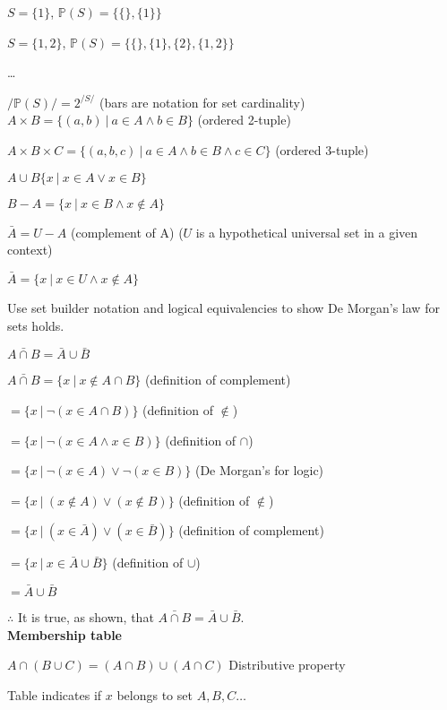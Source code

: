 \documentclass[english,openany]{book}
\begin{document}
	$S = \{1\}$, $\mathbb P (S) = \{  \{\}, \{1\}  \}$

	$S = \{1, 2\}$, $\mathbb P (S) = \{  \{\},  \{ 1 \}, \{ 2 \},  \{1, 2\}  \}$

	\dots

	$/ \mathbb P(S)/ = 2^{ /S/ }$ (bars are notation for set cardinality)\\

	$A \times B = \{ (a,b)\ |\ a \in A \wedge b \in B \}$ (ordered 2-tuple)

	$A \times B \times C = \{ (a,b,c)\ |\ a \in A \wedge b \in B \wedge c \in C \}$ (ordered 3-tuple)

	$A \cup B \{ x \ | \ x \in A \lor x \in B\}$

	$B - A = \{ x \ |\ x \in B \wedge x \notin A \}$

	$\bar{A} = U - A$ (complement of A) ($U$ is a hypothetical universal set in a given context)

	$\bar{A} = \{ x \ |\ x \in U \wedge x \notin A \}$

		Use set builder notation and logical equivalencies to show De Morgan's law for sets holds.

	$\bar{A \cap B} = \bar{A} \cup \bar{B}$

	$\bar{A \cap B} = \{ x \ |\ x \notin A \cap B\} $  (definition of complement)

	$= \{ x \ |\ \neg(x \in A \cap B) \} $ (definition of $\notin$)

	$= \{ x \ |\ \neg(x \in A \wedge x \in B) \} $ (definition of $\cap$)

	$= \{ x \ |\ \neg(x \in A) \lor \neg(x \in B) \} $ (De Morgan's for logic)

	$= \{ x \ |\ (x \notin A) \lor (x \notin B) \} $ (definition of $\notin$)

	$= \{ x \ |\ (x \in \bar{A}) \lor (x \in \bar{B}) \} $ (definition of complement)

	$= \{ x \ |\ x \in \bar{A} \cup \bar{B} \} $ (definition of $\cup$)

	$= \bar{A} \cup \bar{B}$

	$\therefore$ It is true, as shown, that $\bar{A \cap B} = \bar{A} \cup \bar{B}$.\\

	\textbf{Membership table}

	$A \cap (B \cup C) = (A \cap B) \cup (A \cap C)$ Distributive property

	Table indicates if $x$ belongs to set $A, B, C \dots$
\end{document}
